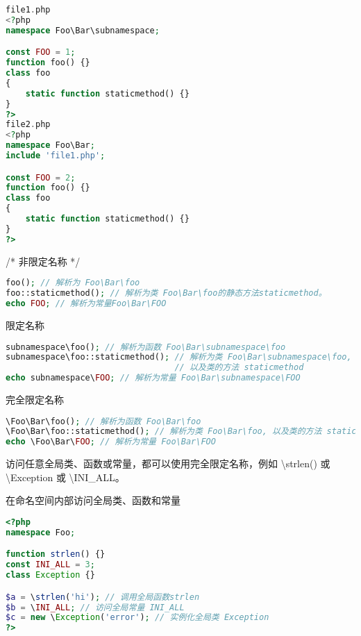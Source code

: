\begin{lstlisting}[language=PHP]
file1.php
<?php
namespace Foo\Bar\subnamespace;

const FOO = 1;
function foo() {}
class foo
{
    static function staticmethod() {}
}
?>
file2.php
<?php
namespace Foo\Bar;
include 'file1.php';

const FOO = 2;
function foo() {}
class foo
{
    static function staticmethod() {}
}
?>
\end{lstlisting}

\begin{compactitem}
\item /* 非限定名称 */

\begin{lstlisting}[language=PHP]
foo(); // 解析为 Foo\Bar\foo
foo::staticmethod(); // 解析为类 Foo\Bar\foo的静态方法staticmethod。
echo FOO; // 解析为常量Foo\Bar\FOO
\end{lstlisting}


\item 限定名称

\begin{lstlisting}[language=PHP]
subnamespace\foo(); // 解析为函数 Foo\Bar\subnamespace\foo
subnamespace\foo::staticmethod(); // 解析为类 Foo\Bar\subnamespace\foo,
                                  // 以及类的方法 staticmethod
echo subnamespace\FOO; // 解析为常量 Foo\Bar\subnamespace\FOO
\end{lstlisting}



\item 完全限定名称

\begin{lstlisting}[language=PHP]
\Foo\Bar\foo(); // 解析为函数 Foo\Bar\foo
\Foo\Bar\foo::staticmethod(); // 解析为类 Foo\Bar\foo, 以及类的方法 staticmethod
echo \Foo\Bar\FOO; // 解析为常量 Foo\Bar\FOO
\end{lstlisting}


\end{compactitem}

访问任意全局类、函数或常量，都可以使用完全限定名称，例如 \textbackslash strlen() 或 \textbackslash Exception 或 \textbackslash INI\_ALL。

\begin{example}
在命名空间内部访问全局类、函数和常量
\begin{lstlisting}[language=PHP]
<?php
namespace Foo;

function strlen() {}
const INI_ALL = 3;
class Exception {}

$a = \strlen('hi'); // 调用全局函数strlen
$b = \INI_ALL; // 访问全局常量 INI_ALL
$c = new \Exception('error'); // 实例化全局类 Exception
?>
\end{lstlisting}
\end{example}


